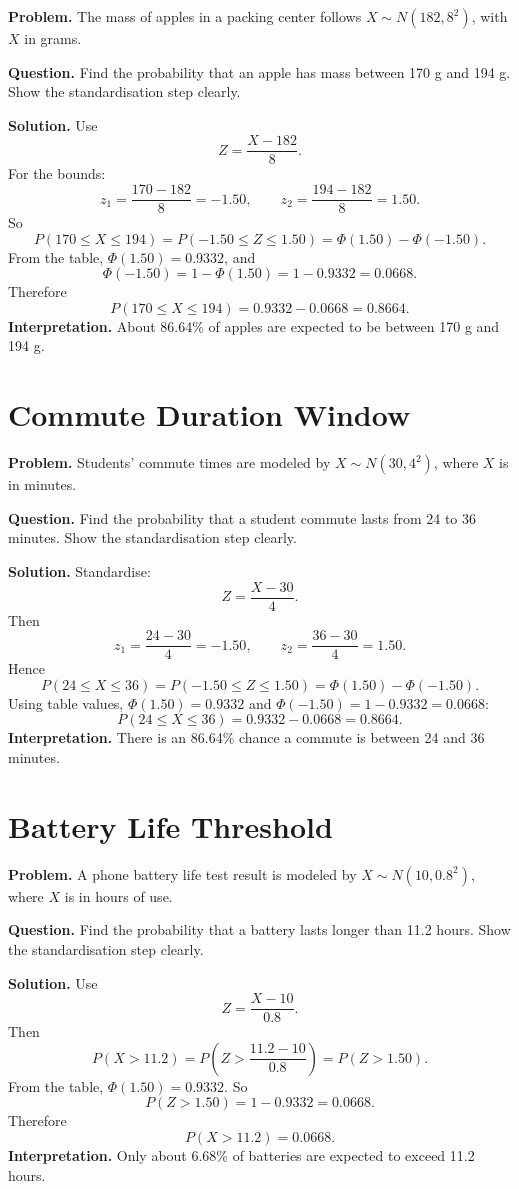 \textbf{Problem.}
The mass of apples in a packing center follows
\(X\sim N(182,8^2)\), with \(X\) in grams.

\textbf{Question.}
Find the probability that an apple has mass between 170 g and 194 g.
Show the standardisation step clearly.

\textbf{Solution.}
Use
\[
Z=\frac{X-182}{8}.
\]
For the bounds:
\[
z_1=\frac{170-182}{8}=-1.50,
\qquad
z_2=\frac{194-182}{8}=1.50.
\]
So
\[
P(170\le X\le 194)=P(-1.50\le Z\le 1.50)=\Phi(1.50)-\Phi(-1.50).
\]
From the table, \(\Phi(1.50)=0.9332\), and
\[
\Phi(-1.50)=1-\Phi(1.50)=1-0.9332=0.0668.
\]
Therefore
\[
P(170\le X\le 194)=0.9332-0.0668=0.8664.
\]
\textbf{Interpretation.}
About 86.64\% of apples are expected to be between 170 g and 194 g.

\section{Commute Duration Window}

\textbf{Problem.}
Students' commute times are modeled by
\(X\sim N(30,4^2)\), where \(X\) is in minutes.

\textbf{Question.}
Find the probability that a student commute lasts from 24 to 36 minutes.
Show the standardisation step clearly.

\textbf{Solution.}
Standardise:
\[
Z=\frac{X-30}{4}.
\]
Then
\[
z_1=\frac{24-30}{4}=-1.50,
\qquad
z_2=\frac{36-30}{4}=1.50.
\]
Hence
\[
P(24\le X\le 36)=P(-1.50\le Z\le 1.50)=\Phi(1.50)-\Phi(-1.50).
\]
Using table values, \(\Phi(1.50)=0.9332\) and
\(\Phi(-1.50)=1-0.9332=0.0668\):
\[
P(24\le X\le 36)=0.9332-0.0668=0.8664.
\]
\textbf{Interpretation.}
There is an 86.64\% chance a commute is between 24 and 36 minutes.

\section{Battery Life Threshold}

\textbf{Problem.}
A phone battery life test result is modeled by
\(X\sim N(10,0.8^2)\), where \(X\) is in hours of use.

\textbf{Question.}
Find the probability that a battery lasts longer than 11.2 hours.
Show the standardisation step clearly.

\textbf{Solution.}
Use
\[
Z=\frac{X-10}{0.8}.
\]
Then
\[
P(X>11.2)=P\!\left(Z>\frac{11.2-10}{0.8}\right)=P(Z>1.50).
\]
From the table, \(\Phi(1.50)=0.9332\). So
\[
P(Z>1.50)=1-0.9332=0.0668.
\]
Therefore
\[
P(X>11.2)=0.0668.
\]
\textbf{Interpretation.}
Only about 6.68\% of batteries are expected to exceed 11.2 hours.

